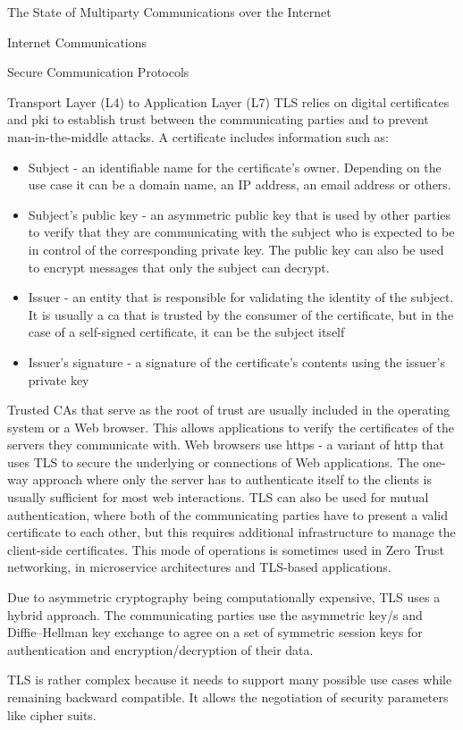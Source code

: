 \begin{frame}[fragile]{The State of Multiparty Communications over the Internet}
\begin{block}{Internet Communications}
\begin{block}{Secure Communication Protocols}
\begin{block}{Transport Layer (L4) to Application Layer (L7)}
TLS relies on digital certificates and \gls{pki} to establish trust between the communicating parties and to prevent man-in-the-middle attacks. A certificate includes information such as:

\begin{itemize}
\tightlist
\item
  Subject - an identifiable name for the certificate's owner. Depending on the use case it can be a domain name, an IP address, an email address or others.
\item
  Subject's public key - an asymmetric public key that is used by other parties to verify that they are communicating with the subject who is expected to be in control of the corresponding private key. The public key can also be used to encrypt messages that only the subject can decrypt.
\item
  Issuer - an entity that is responsible for validating the identity of the subject. It is usually a \gls{ca} that is trusted by the consumer of the certificate, but in the case of a self-signed certificate, it can be the subject itself
\item
  Issuer's signature - a signature of the certificate's contents using the issuer's private key
\end{itemize}

Trusted CAs that serve as the root of trust are usually included in the operating system or a Web browser. This allows applications to verify the certificates of the servers they communicate with. Web browsers use \gls{https} \autocite{httpsRFC} - a variant of \gls{http} that uses TLS to secure the underlying  or  connections of Web applications. The one-way approach where only the server has to authenticate itself to the clients is usually sufficient for most web interactions. TLS can also be used for mutual authentication, where both of the communicating parties have to present a valid certificate to each other, but this requires additional infrastructure to manage the client-side certificates. This mode of operations is sometimes used in Zero Trust networking, in microservice architectures and TLS-based  applications.

Due to asymmetric cryptography being computationally expensive, TLS uses a hybrid approach. The communicating parties use the asymmetric key/s and Diffie--Hellman key exchange to agree on a set of symmetric session keys for authentication and encryption/decryption of their data.

TLS is rather complex because it needs to support many possible use cases while remaining backward compatible. It allows the negotiation of security parameters like cipher suits.


\end{block}
\end{block}
\end{block}
\end{frame}
